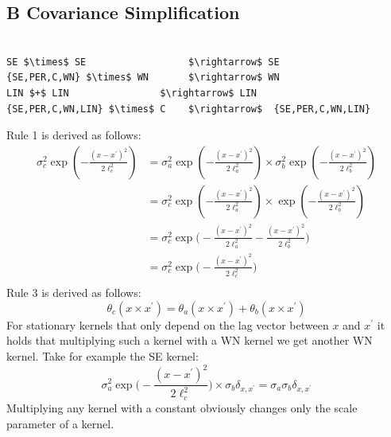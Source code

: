 \documentclass{article} %
\begin{document}
\subsection*{B Covariance Simplification}
\begin{minipage}{\linewidth}
\small
\belowcaptionskip=-10pt
\begin{lstlisting}[frame=single,mathescape,label=alg:simplify,basicstyle=\selectfont\ttfamily]

SE $\times$ SE                  $\rightarrow$ SE 
{SE,PER,C,WN} $\times$ WN       $\rightarrow$ WN
LIN $+$ LIN                $\rightarrow$ LIN
{SE,PER,C,WN,LIN} $\times$ C    $\rightarrow$  {SE,PER,C,WN,LIN} 
\end{lstlisting}
\end{minipage}
Rule 1 is derived as follows:
\begin{equation}
\begin{aligned}
\sigma_c^2 \exp(-\frac{(x-x^\prime)^2}{2\ell_c^2})  &=  \sigma_a^2 \exp(-\frac{(x-x^\prime)^2}{2\ell_a^2}) \times  \sigma_b^2 \exp(-\frac{(x-x^\prime)^2}{2\ell_b^2}) \\
&= \sigma_c^2 \exp(-\frac{(x-x^\prime)^2}{2\ell_a^2}) \times   \exp(-\frac{(x-x^\prime)^2}{2\ell_b^2}) \\
&= \sigma_c^2 \exp \bigg(-\frac{(x-x^\prime)^2}{2\ell_a^2} -\frac{(x-x^\prime)^2}{2\ell_b^2}\bigg) \\
&= \sigma_c^2 \exp \bigg(-\frac{(x-x^\prime)^2}{2\ell_c^2}\bigg) \\
\end{aligned}
\end{equation}
Rule 3 is derived as follows:
\begin{equation}
 \theta_c (x \times x^\prime) = \theta_a (x \times x^\prime) + \theta_b (x \times x^\prime) 
\end{equation}
For stationary kernels that only depend on the lag vector between $x$ and $x^\prime$ it holds that multiplying such a kernel with a WN kernel we get another WN kernel. Take for example the SE kernel:
\begin{equation}
 \sigma_a^2 \exp \bigg(-\frac{(x-x^\prime)^2}{2\ell_c^2}\bigg) \times  \sigma_b \delta_{x,x^\prime} =  \sigma_a \sigma_b \delta_{x,x^\prime}
\end{equation}
Multiplying any kernel with a constant obviously changes only the scale parameter of a kernel.
\newpage


\end{document}
